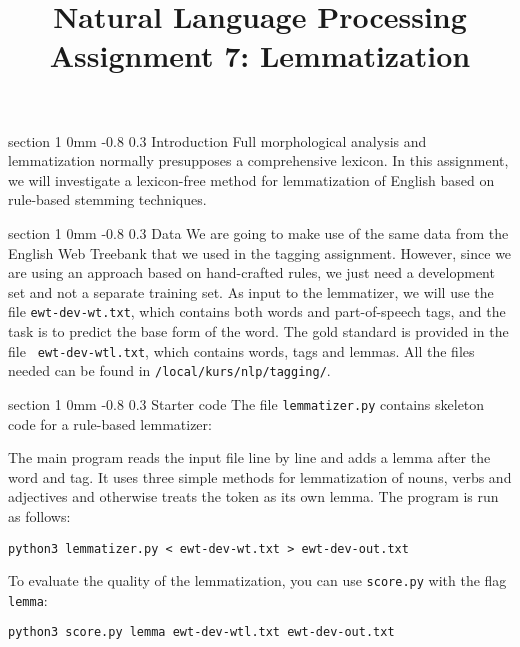 \documentclass[11pt]{article}
\title{{\LARGE Natural Language Processing}\\[1.5mm]{\large Assignment 7: Lemmatization}}
\author{}
\date{} %
\makeatletter
\newcommand{\newsec}[2]{\section{#1}\label{sec:#2}\noindent}
\renewcommand{\section}{\@startsection
{section}%
{1}%
{0mm}%
{-0.8\baselineskip}%
{0.3\baselineskip}%
{\bfseries\large}}%
\makeatother
\begin{document}
 

\maketitle
\vspace{-2mm} \newsec{Introduction}{intro}%
Full morphological analysis and lemmatization normally presupposes a
comprehensive lexicon. In this assignment, we will investigate a
lexicon-free method for lemmatization of English based on rule-based
stemming techniques.

\newsec{Data}{data}%
We are going to make use of the same data from the English Web
Treebank that we used in the tagging assignment. However, since we are
using an approach based on hand-crafted rules, we just need a
development set and not a separate training set. As input to the
lemmatizer, we will use the file {\tt ewt-dev-wt.txt}, which contains
both words and part-of-speech tags, and the task is to predict the
base form of the word. The gold standard is provided in the file {\tt
  ewt-dev-wtl.txt}, which contains words, tags and lemmas.  All the
files needed can be found in {\tt /local/kurs/nlp/tagging/}.

\newsec{Starter code}{code}%
The file {\tt lemmatizer.py} contains skeleton code for a rule-based lemmatizer:
\begin{center}
\fbox{

}
\end{center}
The main program reads the input file line by line and adds a lemma
after the word and tag. It uses three simple methods for lemmatization
of nouns, verbs and adjectives and otherwise treats the token as its
own lemma. The program is run as follows:
\begin{verbatim}
python3 lemmatizer.py < ewt-dev-wt.txt > ewt-dev-out.txt
\end{verbatim}
To evaluate the quality of the lemmatization, you can use {\tt score.py} with the flag {\tt lemma}:
\begin{verbatim}
python3 score.py lemma ewt-dev-wtl.txt ewt-dev-out.txt
\end{verbatim}
\end{document}
